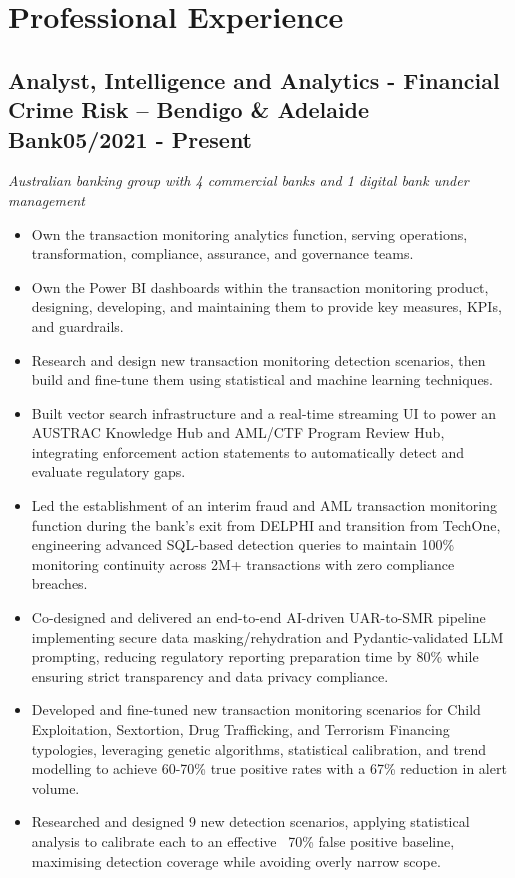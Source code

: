 \documentclass[11pt,a4paper]{article}
\newcommand{\role}[3]{%
  \subsection*{#1 \textnormal{--} \textbf{#2}\hfill #3}}
\begin{document}
\section*{Professional Experience}

\role{Analyst, Intelligence and Analytics - Financial Crime Risk}{Bendigo \& Adelaide Bank}{05/2021 - Present}
\textit{Australian banking group with 4 commercial banks and 1 digital bank under management}
\begin{itemize}
  \item Own the transaction monitoring analytics function, serving operations, transformation, compliance, assurance, and governance teams.
  \item Own the Power BI dashboards within the transaction monitoring product, designing, developing, and maintaining them to provide key measures, KPIs, and guardrails.
  \item Research and design new transaction monitoring detection scenarios, then build and fine-tune them using statistical and machine learning techniques.
  \item Built vector search infrastructure and a real-time streaming UI to power an AUSTRAC Knowledge Hub and AML/CTF Program Review Hub, integrating enforcement action statements to automatically detect and evaluate regulatory gaps.
  \item Led the establishment of an interim fraud and AML transaction monitoring function during the bank's exit from DELPHI and transition from TechOne, engineering advanced SQL-based detection queries to maintain 100\% monitoring continuity across 2M+ transactions with zero compliance breaches.
  \item Co-designed and delivered an end-to-end AI-driven UAR-to-SMR pipeline implementing secure data masking/rehydration and Pydantic-validated LLM prompting, reducing regulatory reporting preparation time by 80\% while ensuring strict transparency and data privacy compliance.
  \item Developed and fine-tuned new transaction monitoring scenarios for Child Exploitation, Sextortion, Drug Trafficking, and Terrorism Financing typologies, leveraging genetic algorithms, statistical calibration, and trend modelling to achieve 60-70\% true positive rates with a 67\% reduction in alert volume.
  \item Researched and designed 9 new detection scenarios, applying statistical analysis to calibrate each to an effective ~70\% false positive baseline, maximising detection coverage while avoiding overly narrow scope.

\end{itemize}
\end{document}
